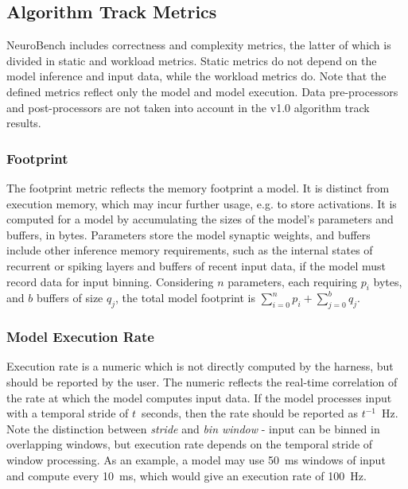 \subsection*{Algorithm Track Metrics}


NeuroBench includes correctness and complexity metrics, the latter of which is divided in static and workload metrics. Static metrics do not depend on the model inference and input data, while the workload metrics do. Note that the defined metrics reflect only the model and model execution. Data pre-processors and post-processors are not taken into account in the v1.0 algorithm track results. 

\subsubsection*{Footprint}
The footprint metric reflects the memory footprint a model. It is distinct from execution memory, which may incur further usage, e.g. to store activations. It is computed for a model by accumulating the sizes of the model's parameters and buffers, in bytes.
Parameters store the model synaptic weights, and buffers include other inference memory requirements, such as the internal states of recurrent or spiking layers and buffers of recent input data, if the model must record data for input binning. Considering $n$ parameters, each requiring $p_i$ bytes, and $b$ buffers of size $q_j$, the total model footprint is $\sum_{i=0}^{n}p_i + \sum_{j=0}^{b}q_j$.

\subsubsection*{Model Execution Rate}
Execution rate is a numeric which is not directly computed by the harness, but should be reported by the user. 
The numeric reflects the real-time correlation of the rate at which the model computes input data. If the model processes input with a temporal stride of $t$~seconds, then the rate should be reported as $t^{-1}$~Hz. Note the distinction between \textit{stride} and \textit{bin window} - input can be binned in overlapping windows, but execution rate depends on the temporal stride of window processing. As an example, a model may use 50~ms windows of input and compute every 10~ms, which would give an execution rate of 100~Hz.

